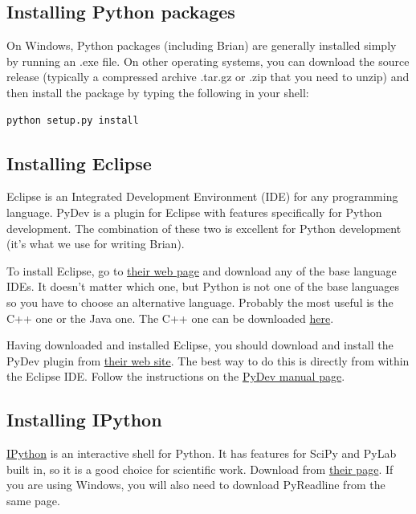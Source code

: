 \documentclass[letterpaper,10pt]{manual}
\begin{document}
\subsection{Installing Python packages}

On Windows, Python packages (including Brian) are generally installed simply by running an .exe file.
On other operating systems, you can download the source release (typically a compressed
archive .tar.gz or .zip that you need to unzip) and then install the package by typing the following in your
shell:

\begin{Verbatim}[commandchars=@\[\]]
python setup.py install
\end{Verbatim}


\subsection{Installing Eclipse}

Eclipse is an Integrated Development Environment (IDE) for any programming language. PyDev is a plugin
for Eclipse with features specifically for Python development. The combination of these two is
excellent for Python development (it's what we use for writing Brian).

To install Eclipse, go to \href{http://www.eclipse.org/}{their web page} and download any of the base
language IDEs. It doesn't matter which one, but Python is not one of the base languages so you have
to choose an alternative language. Probably the most useful is the C++ one or the Java one. The C++
one can be downloaded \href{http://www.eclipse.org/cdt/downloads.php}{here}.

Having downloaded and installed Eclipse, you should download and install the PyDev plugin from
\href{http://pydev.sourceforge.net/}{their web site}. The best way to do this is directly from within
the Eclipse IDE. Follow the instructions on the \href{http://www.fabioz.com/pydev/manual\_101\_root.html}{PyDev manual page}.


\subsection{Installing IPython}

\href{http://ipython.scipy.org/moin/}{IPython} is an interactive shell for Python.
It has features for SciPy and PyLab built in, so it is a good choice for scientific work.
Download from \href{http://ipython.scipy.org/moin/Download}{their page}. If you are using Windows, you
will also need to download PyReadline from the same page.
\end{document}
